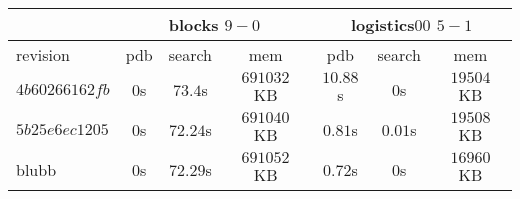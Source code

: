 \documentclass[a4paper,12pt]{scrartcl}
\begin{document}
\begin{tabular}{|l|c|c|c|c|c|c|}\hline
& \multicolumn{3}{c|}{blocks $9-0$} & \multicolumn{3}{c|}{logistics$00$ $5-1$}\\\hline
revision & pdb & search & mem & pdb & search & mem\\\hline
$4b60266162fb$ & $0$s & $73.4$s & $691032$ KB & $10.88$s & $0$s & $19504$ KB\\\hline
$5b25e6ec1205$ & $0$s & $72.24$s & $691040$ KB & $0.81$s & $0.01$s & $19508$ KB\\\hline
blubb & $0$s & $72.29$s & $691052$ KB & $0.72$s & $0$s & $16960$ KB\\\hline
\end{tabular}
\end{document}
